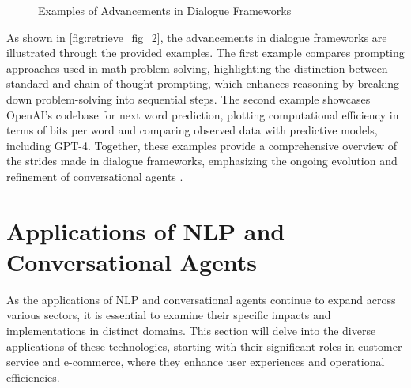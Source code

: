 {
\begin{figure}[ht!]
\centering
{}\hspace{0.03\textwidth}
\hspace{0.03\textwidth}
\caption{Examples of Advancements in Dialogue Frameworks}\label{fig:retrieve_fig_2}
\end{figure}
}

As shown in \autoref{fig:retrieve_fig_2}, the advancements in dialogue frameworks are illustrated through the provided examples. The first example compares prompting approaches used in math problem solving, highlighting the distinction between standard and chain-of-thought prompting, which enhances reasoning by breaking down problem-solving into sequential steps. The second example showcases OpenAI's codebase for next word prediction, plotting computational efficiency in terms of bits per word and comparing observed data with predictive models, including GPT-4. Together, these examples provide a comprehensive overview of the strides made in dialogue frameworks, emphasizing the ongoing evolution and refinement of conversational agents \cite{wei2022chain,GPT-4Techn0}.











\section{Applications of NLP and Conversational Agents} \label{sec:Applications of NLP and Conversational Agents}

As the applications of NLP and conversational agents continue to expand across various sectors, it is essential to examine their specific impacts and implementations in distinct domains. This section will delve into the diverse applications of these technologies, starting with their significant roles in customer service and e-commerce, where they enhance user experiences and operational efficiencies.





